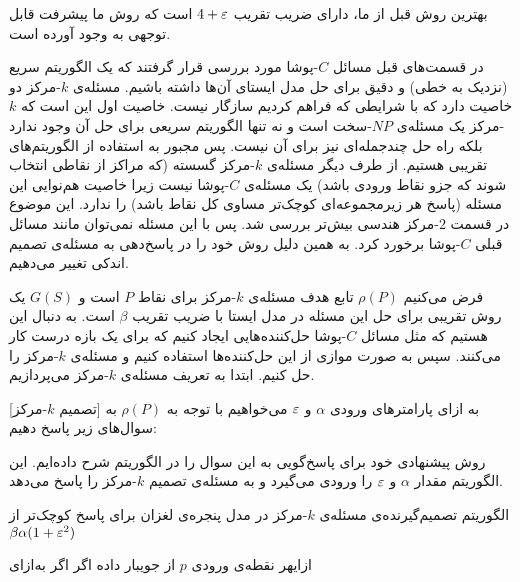 بهترین روش قبل از ما، دارای ضریب تقریب $4+\varepsilon$ است  که روش ما پیشرفت قابل توجهی به وجود آورده است.

در قسمت‌های قبل مسائل $C$-پوشا مورد بررسی قرار گرفتند که یک الگوریتم سریع (نزدیک به خطی) و دقیق برای حل مدل ایستای آن‌ها داشته باشیم. مسئله‌ی $k$-مرکز دو خاصیت دارد که با شرایطی که فراهم کردیم سازگار نیست. خاصیت اول این است که $k$-مرکز یک مسئله‌‌ی $NP$-سخت است و نه تنها الگوریتم سریعی برای حل آن وجود ندارد بلکه راه حل چندجمله‌ای نیز برای آن نیست. پس مجبور به استفاده از الگوریتم‌های تقریبی هستیم. از طرف دیگر مسئله‌ی $k$-مرکز گسسته (که مراکز از نقاطی انتخاب شوند که جزو نقاط ورودی باشد) یک مسئله‌ی $C$-پوشا نیست زیرا خاصیت هم‌نوایی این مسئله (پاسخ هر زیرمجموعه‌ای کوچک‌تر مساوی کل نقاط باشد) را ندارد. این موضوع در قسمت $2$-مرکز هندسی  بیش‌تر بررسی شد. پس با این مسئله نمی‌توان مانند مسائل قبلی  $C$-پوشا برخورد کرد. به همین دلیل روش خود را در پاسخ‌دهی به مسئله‌ی تصمیم اندکی تغییر می‌دهیم.

فرض می‌کنیم $\rho(P)$ تابع هدف مسئله‌ی $k$-مرکز برای نقاط $P$ است و $G(S)$ یک روش تقریبی برای حل این مسئله در مدل ایستا با ضریب تقریب $\beta$ است. به دنبال این هستیم که مثل مسائل $C$-پوشا حل‌کننده‌هایی ایجاد کنیم که برای یک بازه درست کار می‌کنند. سپس به صورت موازی از این حل‌کننده‌ها استفاده کنیم و مسئله‌ی $k$-مرکز را حل کنیم. ابتدا به تعریف مسئله‌ی $k$-مرکز می‌پردازیم.

[تصمیم $k$-مرکز]
به ازای پارامترهای ورودی $\alpha$ و $\varepsilon$ می‌خواهیم با توجه به $\rho(P)$ به سوال‌های زیر پاسخ دهیم:

روش پیشنهادی خود برای پاسخ‌گویی به این سوال را در الگوریتم   شرح داده‌ایم. این الگوریتم مقدار $\alpha$ و $\varepsilon$ را ورودی می‌گیرد و به مسئله‌ی تصمیم $k$-مرکز را پاسخ می‌دهد.
\caption
{الگوریتم تصمیم‌گیرنده‌ی مسئله‌ی  $k$-مرکز در مدل پنجره‌ی لغزان برای پاسخ کوچک‌تر از $\beta \alpha ( 1+ \varepsilon^2)$ }
‌ازای{هر نقطه‌ی ورودی $p$ از جویبار داده}
‌اگر{}
‌اگر{}
‌به‌ازای{}



